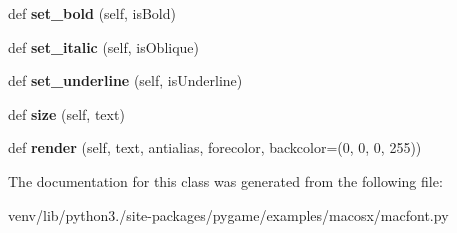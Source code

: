 \begin{DoxyCompactItemize}
\item 
\mbox{\label{classmacfont_1_1_sys_font_a00a0bdd73f63b32db9d83bbc4cc768f1}} 
def {\bfseries set\+\_\+bold} (self, is\+Bold)
\item 
\mbox{\label{classmacfont_1_1_sys_font_a1b578c0a9a40d26974f277ef22e76146}} 
def {\bfseries set\+\_\+italic} (self, is\+Oblique)
\item 
\mbox{\label{classmacfont_1_1_sys_font_aaa0c0d61179e11c3507a6faa8ec65311}} 
def {\bfseries set\+\_\+underline} (self, is\+Underline)
\item 
\mbox{\label{classmacfont_1_1_sys_font_a3b57565ca5f8002b415c02168eea58d0}} 
def {\bfseries size} (self, text)
\item 
\mbox{\label{classmacfont_1_1_sys_font_ad3bc21a84edc345deff940457c6b9196}} 
def {\bfseries render} (self, text, antialias, forecolor, backcolor=(0, 0, 0, 255))
\end{DoxyCompactItemize}


The documentation for this class was generated from the following file\+:\begin{DoxyCompactItemize}
\item 
venv/lib/python3./site-\/packages/pygame/examples/macosx/macfont.\+py\end{DoxyCompactItemize}
